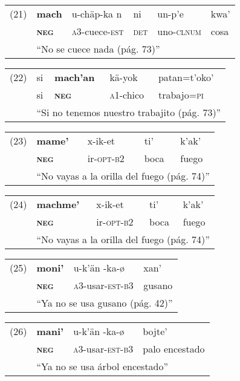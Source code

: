 {\setmainfont{Charis SIL} 

\begin{tabular}{llllll}
(21) & \textbf{mach} & u-chäp-ka n& ni & un-p'e & kwa' \\
& \textsc{\textbf{neg}} & \textsc{a3}-cuece-\textsc{est} & \textsc{det} & uno-\textsc{clnum} & cosa \\
& \multicolumn{5}{l}{``No se cuece nada (pág. 73)''} \\
\end{tabular} \vspace{0.3cm}

\begin{tabular}{lllll}
(22) & si & \textbf{mach'an} & kä-yok  & patan=t'oko'\\
& si & \textsc{\textbf{neg}} & \textsc{a1}-chico & trabajo=\textsc{pi}\\
& \multicolumn{4}{l}{``Si no tenemos nuestro trabajito (pág. 73)''} \\
\end{tabular} \vspace{0.3cm}

\begin{tabular}{lllll}
(23) & \textbf{mame'} & x-ik-et & ti' & k'ak' \\
& \textsc{\textbf{neg}} & ir-\textsc{opt-b2} & boca & fuego\\
& \multicolumn{4}{l}{``No vayas a la orilla del fuego (pág. 74)''} \\
\end{tabular} \vspace{0.3cm}

\begin{tabular}{lllll}
(24) & \textbf{machme'} & x-ik-et & ti' & k'ak' \\
& \textsc{\textbf{neg}} & ir-\textsc{opt-b2} & boca & fuego\\
& \multicolumn{4}{l}{``No vayas a la orilla del fuego (pág. 74)''} \\
\end{tabular} \vspace{0.3cm}

\begin{tabular}{llll}
(25) & \textbf{moni'} & u-k'än -ka-ø & xan' \\
& \textsc{\textbf{neg}} & \textsc{a3}-usar-\textsc{est-b3} & gusano \\
& \multicolumn{3}{l}{``Ya no se usa gusano (pág. 42)''}\\
\end{tabular} \vspace{0.3cm}

\begin{tabular}{llll}
(26) & \textbf{mani'} & u-k'än -ka-ø & bojte' \\
& \textsc{\textbf{neg}} & \textsc{a3}-usar-\textsc{est-b3} & palo encestado \\
 & \multicolumn{3}{l}{``Ya no se usa árbol encestado''} \\
\end{tabular} \vspace{0.5cm}
}

